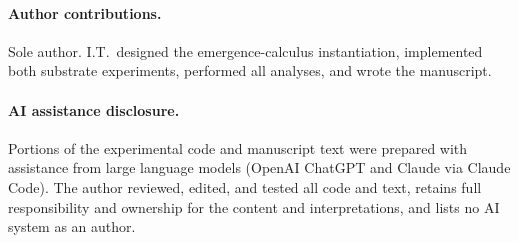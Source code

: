 \documentclass[11pt]{article}
\begin{document}
\paragraph{Author contributions.}
Sole author. I.T.\ designed the emergence-calculus instantiation, implemented both substrate experiments, performed all analyses, and wrote the manuscript.

\paragraph{AI assistance disclosure.}
Portions of the experimental code and manuscript text were prepared with assistance from large language models (OpenAI ChatGPT and Claude via Claude Code). The author reviewed, edited, and tested all code and text, retains full responsibility and ownership for the content and interpretations, and lists no AI system as an author.



\end{document}
